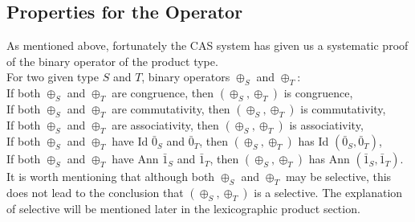 \documentclass[a4paper,12pt,twoside,openright]{report}
\begin{document}
\subsection{Properties for the Operator}
As mentioned above, fortunately the CAS system has given us a systematic proof of the binary operator of the product type.\\
For two given type $S$ and $T$, binary operators $\oplus_S$ and $\oplus_T$:\\
If both $\oplus_S$ and $\oplus_T$ are congruence, then $(\oplus_S,\oplus_T)$ is congruence,\\
If both $\oplus_S$ and $\oplus_T$ are commutativity, then $(\oplus_S,\oplus_T)$ is commutativity,\\
If both $\oplus_S$ and $\oplus_T$ are associativity, then $(\oplus_S,\oplus_T)$ is associativity,\\
If both $\oplus_S$ and $\oplus_T$ have Id $\bar0_S$ and $\bar0_T$, then $(\oplus_S,\oplus_T)$ has Id $(\bar0_S,\bar0_T)$,\\
If both $\oplus_S$ and $\oplus_T$ have Ann $\bar1_S$ and $\bar1_T$, then $(\oplus_S,\oplus_T)$ has Ann $(\bar1_S,\bar1_T)$.\\
It is worth mentioning that although both $\oplus_S$ and $\oplus_T$ may be selective, this does not lead to the conclusion that $(\oplus_S,\oplus_T)$ is a selective.
The explanation of selective will be mentioned later in the lexicographic product section.
\end{document}
